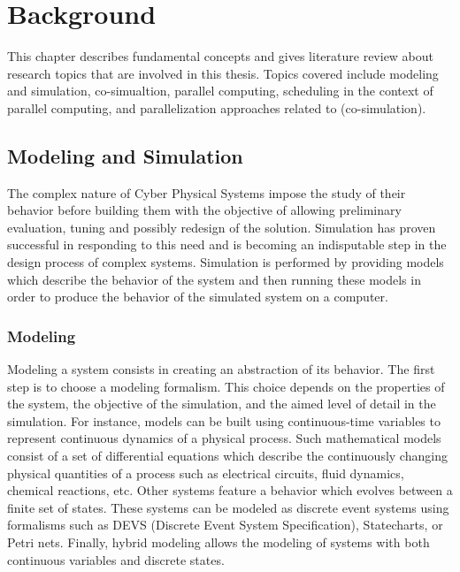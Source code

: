 \chapter{\label{ch:2-bkgnd}Background}

\minitoc

This chapter describes fundamental concepts and gives literature review about research topics that are involved in this thesis. Topics covered include modeling and simulation, co-simualtion, parallel computing, scheduling in the context of parallel computing, and parallelization approaches related to (co-simulation). 

\section{Modeling and Simulation}

The complex nature of Cyber Physical Systems impose the study of their behavior before building them with the objective of allowing preliminary evaluation, tuning and possibly redesign of the solution. Simulation has proven successful in responding to this need and is becoming an indisputable step in the design process of complex systems. Simulation is performed by providing models which describe the behavior of the system and then running these models in order to produce the behavior of the simulated system on a computer.   

\subsection{Modeling}

Modeling a system consists in creating an abstraction of its behavior. The first step is to choose a modeling formalism. This choice depends on the properties of the system, the objective of the simulation, and the aimed level of detail in the simulation. For instance, models can be built using continuous-time variables to represent continuous dynamics of a physical process. Such mathematical models consist of a set of differential equations which describe the continuously changing physical quantities of a process such as electrical circuits, fluid dynamics, chemical reactions, etc. Other systems feature a behavior which evolves between a finite set of states. These systems can be modeled as discrete event systems using formalisms such as DEVS (Discrete Event System Specification), Statecharts, or Petri nets. Finally, hybrid modeling allows the modeling of systems with both continuous variables and discrete states.


